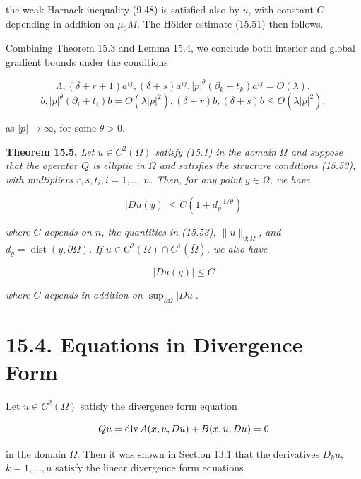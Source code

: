 the weak Harnack inequality (9.48) is satisfied also by $u$, with constant $C$ depending in addition on $\mu_0 M$. The H\"older estimate (15.51) then follows.

Combining Theorem 15.3 and Lemma 15.4, we conclude both interior and global gradient bounds under the conditions

\begin{equation}
\Lambda,(\delta + r + 1)a^{ij},(\delta + s)a^{ij},|p|^\theta(\partial_k + t_k)a^{ij} = O(\lambda),
\end{equation}
\[
b,|p|^\theta(\partial_i + t_i)b = O(\lambda|p|^2),(\delta + r)b,(\delta + s)b \leq O(\lambda|p|^2),
\]

as $|p| \to \infty$, for some $\theta > 0$.

\textbf{Theorem 15.5.} \emph{Let $u \in C^2(\Omega)$ satisfy (15.1) in the domain $\Omega$ and suppose that the operator $Q$ is elliptic in $\Omega$ and satisfies the structure conditions (15.53), with multipliers $r, s, t_i, i = 1,\ldots,n$. Then, for any point $y \in \Omega$, we have}

\begin{equation}
|Du(y)| \leq C\left(1 + d_y^{-1/\theta}\right)
\end{equation}

\emph{where $C$ depends on $n$, the quantities in (15.53), $\|u\|_{0;\Omega}$, and $d_y = \operatorname{dist}(y,\partial \Omega)$. If $u \in C^2(\Omega)\cap C^1(\bar{\Omega})$, we also have}

\begin{equation}
|Du(y)| \leq C
\end{equation}

\emph{where $C$ depends in addition on $\sup_{\partial\Omega}|Du|$.}

\bigskip

\section*{15.4. Equations in Divergence Form}

Let $u \in C^2(\Omega)$ satisfy the divergence form equation

\begin{equation}
Qu = \operatorname{div} A(x,u,Du) + B(x,u,Du) = 0
\end{equation}

in the domain $\Omega$. Then it was shown in Section 13.1 that the derivatives $D_k u$, $k = 1,\ldots,n$ satisfy the linear divergence form equations

